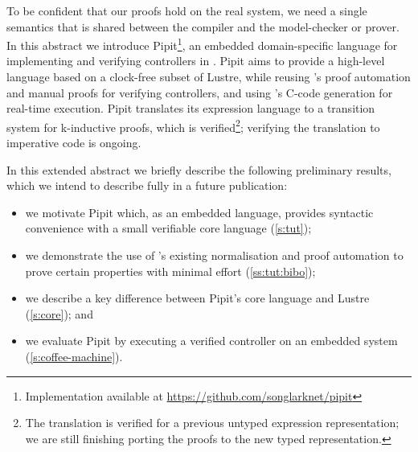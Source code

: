 \documentclass[sigplan,screen, review]{acmart}
\begin{document}
To be confident that our proofs hold on the real system, we need a single semantics that is shared between the compiler and the model-checker or prover.
In this abstract we introduce Pipit\footnote{Implementation available at \url{https://github.com/songlarknet/pipit}}, an embedded domain-specific language for implementing and verifying controllers in \fstar{}.
Pipit aims to provide a high-level language based on a clock-free subset of Lustre, while reusing \fstar{}'s proof automation and manual proofs for verifying controllers, and using \lowstar{}'s C-code generation for real-time execution.
Pipit translates its expression language to a transition system for k-inductive proofs, which is verified\footnote{The translation is verified for a previous untyped expression representation; we are still finishing porting the proofs to the new typed representation.}; verifying the translation to imperative code is ongoing.

In this extended abstract we briefly describe the following preliminary results, which we intend to describe fully in a future publication:

\begin{itemize}
  \item we motivate Pipit which, as an embedded language, provides syntactic convenience with a small verifiable core language (\autoref{s:tut});
  \item we demonstrate the use of \fstar{}'s existing normalisation and proof automation to prove certain properties with minimal effort (\autoref{ss:tut:bibo});
  \item we describe a key difference between Pipit's core language and Lustre (\autoref{s:core}); and
  \item we evaluate Pipit by executing a verified controller on an embedded system (\autoref{s:coffee-machine}).
\end{itemize}
\end{document}
